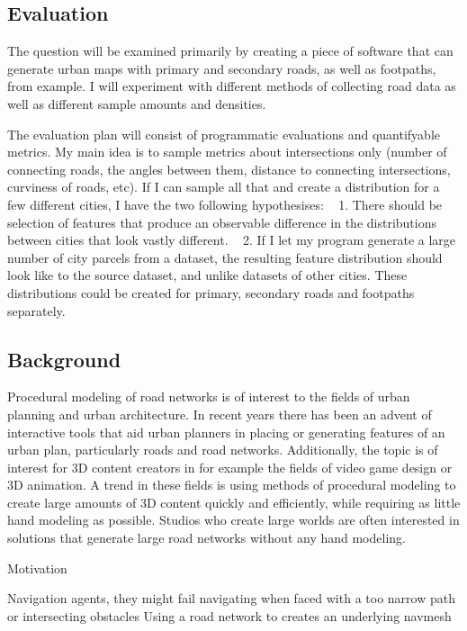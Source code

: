 \documentclass[a4paper]{article}
\begin{document}
\subsection{Evaluation}

The question will be examined primarily by creating a piece of software that can generate urban maps with primary and secondary roads, as well as footpaths, from example. I will experiment with different methods of collecting road data as well as different sample amounts and densities.

The evaluation plan will consist of programmatic evaluations and quantifyable metrics. My main idea is to sample metrics about intersections only (number of connecting roads, the angles between them, distance to connecting intersections, curviness of roads, etc). If I can sample all that and create a distribution for a few different cities, I have the two following hypothesises:
  1. There should be selection of features that produce an observable difference in the distributions between cities that look vastly different.
  2. If I let my program generate a large number of city parcels from a dataset, the resulting feature distribution should look like to the source dataset, and unlike datasets of other cities.
These distributions could be created for primary, secondary roads and footpaths separately.

\subsection{Background}

Procedural modeling of road networks is of interest to the fields of urban planning and urban architecture. In recent years there has been an advent of interactive tools that aid urban planners in placing or generating features of an urban plan, particularly roads and road networks.
Additionally, the topic is of interest for 3D content creators in for example the fields of video game design or 3D animation. A trend in these fields is using methods of procedural modeling to create large amounts of 3D content quickly and efficiently, while requiring as little hand modeling as possible. Studios who create large worlds are often interested in solutions that generate large road networks without any hand modeling.

Motivation

Navigation agents, they might fail navigating when faced with a too narrow path or intersecting obstacles
Using a road network to creates an underlying navmesh
\end{document}
